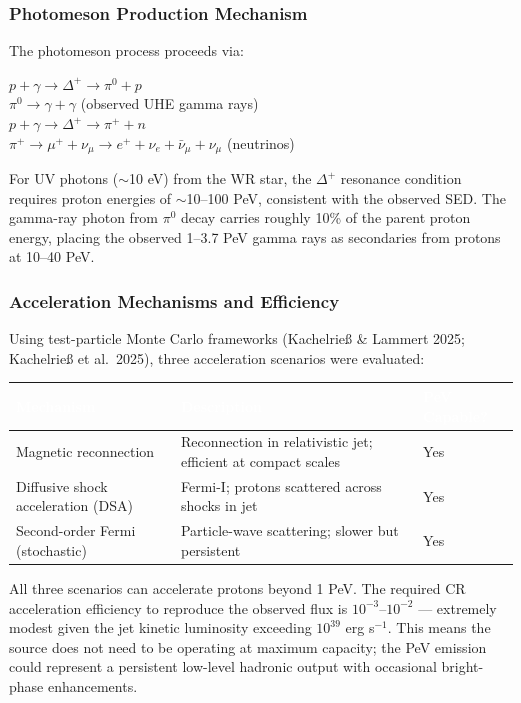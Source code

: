 \documentclass[11pt,letterpaper]{article}
\newcommand{\tableheader}[1]{\textbf{\sffamily\textcolor{white}{#1}}}
\begin{document}
\subsubsection{Photomeson Production Mechanism}

The photomeson process proceeds via:
\begin{center}
$p + \gamma \rightarrow \Delta^+ \rightarrow \pi^0 + p$ \\[0.3em]
$\pi^0 \rightarrow \gamma + \gamma$ (observed UHE gamma rays) \\[0.3em]
$p + \gamma \rightarrow \Delta^+ \rightarrow \pi^+ + n$ \\[0.3em]
$\pi^+ \rightarrow \mu^+ + \nu_\mu \rightarrow e^+ + \nu_e + \bar{\nu}_\mu + \nu_\mu$ (neutrinos)
\end{center}

For UV photons ($\sim$10 eV) from the WR star, the $\Delta^+$ resonance condition requires proton energies of $\sim$10--100 PeV, consistent with the observed SED. The gamma-ray photon from $\pi^0$ decay carries roughly 10\% of the parent proton energy, placing the observed 1--3.7 PeV gamma rays as secondaries from protons at 10--40 PeV.

\subsubsection{Acceleration Mechanisms and Efficiency}

Using test-particle Monte Carlo frameworks (Kachelrieß \& Lammert 2025; Kachelrieß et al.\ 2025), three acceleration scenarios were evaluated:

\begin{center}
\begin{tabularx}{\textwidth}{L{4.5cm}XC{2.5cm}}
\toprule
{}
\tableheader{Mechanism} & \tableheader{Description} & \tableheader{PeV Capable?} \\
\midrule
Magnetic reconnection & Reconnection in relativistic jet; efficient at compact scales & Yes \\
Diffusive shock acceleration (DSA) & Fermi-I; protons scattered across shocks in jet & Yes \\
Second-order Fermi (stochastic) & Particle-wave scattering; slower but persistent & Yes \\
\bottomrule
\end{tabularx}
\end{center}

All three scenarios can accelerate protons beyond 1 PeV. The required CR acceleration efficiency to reproduce the observed flux is $10^{-3}$--$10^{-2}$ --- extremely modest given the jet kinetic luminosity exceeding $10^{39}$ erg s$^{-1}$. This means the source does not need to be operating at maximum capacity; the PeV emission could represent a persistent low-level hadronic output with occasional bright-phase enhancements.
\end{document}
